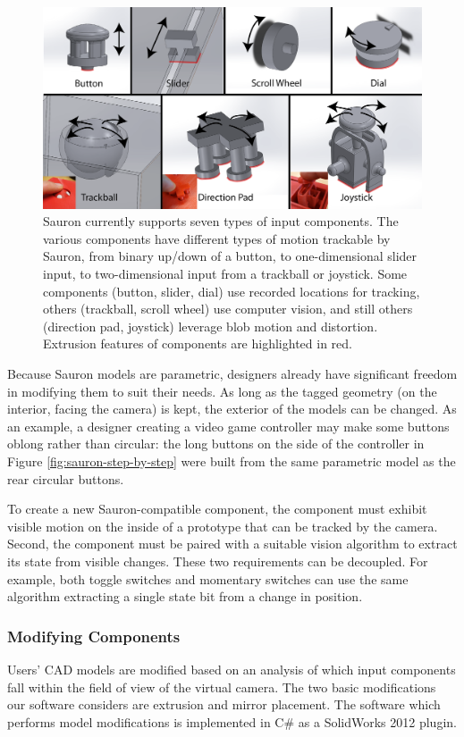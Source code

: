 \begin{figure}
\centering
\includegraphics[width=\textwidth]{figures/sauron/sauron-inputs.png}
\caption{Sauron currently supports seven types of input components. The various components have different types of motion trackable by Sauron, from binary up/down of a button, to one-dimensional slider input, to two-dimensional input from a trackball or joystick. Some components (button, slider, dial) use recorded locations for tracking, others (trackball, scroll wheel) use computer vision, and still others (direction pad, joystick) leverage blob motion and distortion. Extrusion features of components are highlighted in red.}
\label{fig:sauron-components}
\end{figure}

Because Sauron models are parametric, designers already have significant freedom in modifying them to suit their needs. As long as the tagged geometry (on the interior, facing the camera) is kept, the exterior of the models can be changed. As an example, a designer creating a video game controller may make some buttons oblong rather than circular: the long buttons on the side of the controller in Figure \ref{fig:sauron-step-by-step} were built from the same parametric model as the rear circular buttons.

To create a new Sauron-compatible component, the component must exhibit visible motion on the inside of a prototype that can be tracked by the camera. Second, the component must be paired with a suitable vision algorithm to extract its state from visible changes. These two requirements can be decoupled. 
For example, both toggle switches and momentary switches can use the same algorithm extracting a single state bit from a change in position.

\subsubsection{Modifying Components}
Users' CAD models are modified based on an analysis of which input components fall within the field of view of the virtual camera. The two basic modifications our software considers are extrusion and mirror placement. The software which performs model modifications is implemented in C\# as a SolidWorks 2012 plugin. 

